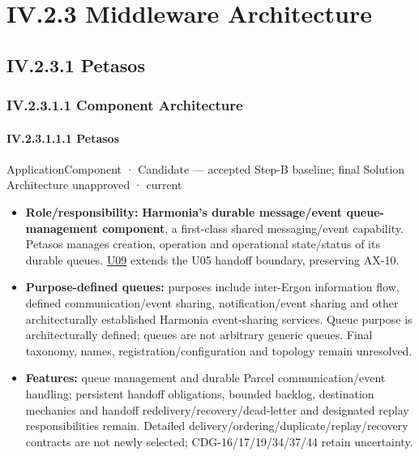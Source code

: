 \section*{IV.2.3 Middleware Architecture}
\label{navigation:IV.2.3}

\subsection*{IV.2.3.1 Petasos}
\label{navigation:IV.2.3.1}

\subsubsection*{IV.2.3.1.1 Component Architecture}
\label{navigation:IV.2.3.1.1}

\paragraph*{IV.2.3.1.1.1 Petasos}
\label{navigation:IV.2.3.1.1.1}

\label{element:195e5f10db8e419391354197b5d7a8cc}
{\small ApplicationComponent · Candidate — accepted Step-B baseline; final Solution Architecture unapproved · current}\par

\begin{itemize}


\item \textbf{Role/responsibility:} \textbf{Harmonia's durable message/event queue-management
  component}, a first-class shared messaging/event capability. Petasos manages
  creation, operation and operational state/status of its durable queues.
  \href{\detokenize{../../../../../docs/markdown/05-information-systems-architecture/sources.md#u09}}{U09} extends the U05 handoff boundary, preserving AX-10.

\item \textbf{Purpose-defined queues:} purposes include inter-Ergon information flow,
  defined communication/event sharing, notification/event sharing and other
  architecturally established Harmonia event-sharing services. Queue purpose is
  architecturally defined; queues are not arbitrary generic queues. Final taxonomy,
  names, registration/configuration and topology remain unresolved.

\item \textbf{Features:} queue management and durable Parcel communication/event handling;
  persistent handoff obligations, bounded backlog, destination mechanics and
  handoff redelivery/recovery/dead-letter and designated replay responsibilities
  remain. Detailed delivery/ordering/duplicate/replay/recovery contracts are not
  newly selected; CDG-16/17/19/34/37/44 retain uncertainty.

\end{itemize}







